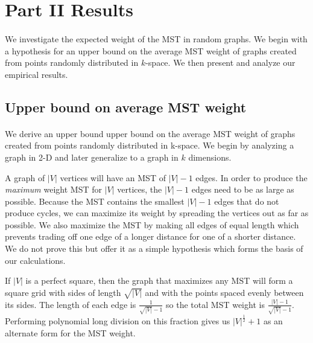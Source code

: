 \section{Part II Results}
\label{sec:part2}

\paragraph{}
We investigate the expected weight of the MST in random graphs. We begin with a
hypothesis for an upper bound on the average MST weight of graphs created from
points randomly distributed in $k$-space. We then present and analyze our
empirical results.


\subsection{Upper bound on average MST weight}
\paragraph{}
We derive an upper bound upper bound on the average MST weight of graphs created
from points randomly distributed in k-space. We begin by analyzing a graph in
2-D and later generalize to a graph in $k$ dimensions.

A graph of $|V|$ vertices will have an MST of $|V|-1$ edges. In order to produce
the \textit{maximum} weight MST for $|V|$ vertices, the $|V|-1$ edges need to be as
large as possible. Because the MST contains the smallest $|V|-1$ edges that do
not produce cycles, we can maximize its weight by spreading the vertices out as far
as possible. We also maximize the MST by making all edges of equal length which
prevents trading off one edge of a longer distance for one of a shorter
distance. We do not prove this but offer it as a simple hypothesis which forms
the basis of our calculations.

If $|V|$ is a perfect square, then the graph that maximizes any MST will form a
square grid with sides of length $\sqrt{|V|}$ and with the points spaced evenly
between its sides. The length of each edge is $\frac{1}{\sqrt{|V|}-1}$ so the
total MST weight is $\frac{|V|-1}{\sqrt{|V|}-1}$. Performing polynomial long
division on this fraction gives us $|V|^{\frac{1}{2}}+1$ as an alternate form
for the MST weight.

